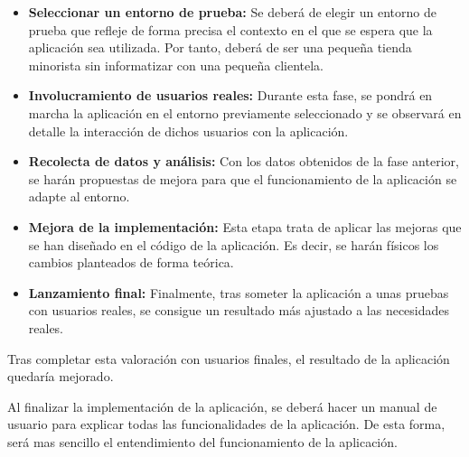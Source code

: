 \begin{itemize}
	\item \textbf{Seleccionar un entorno de prueba: } Se deberá de elegir un entorno de prueba que refleje de forma precisa el contexto en el que se espera que la aplicación sea utilizada. Por tanto, deberá de ser una pequeña tienda minorista sin informatizar con una pequeña clientela. 
	\item \textbf{Involucramiento de usuarios reales: } Durante esta fase, se pondrá en marcha la aplicación en el entorno previamente seleccionado y se observará en detalle la interacción de dichos usuarios con la aplicación. 
	\item \textbf{Recolecta de datos y análisis: } Con los datos obtenidos de la fase anterior, se harán propuestas de mejora para que el funcionamiento de la aplicación se adapte al entorno. 
	\item \textbf{Mejora de la implementación: } Esta etapa trata de aplicar las mejoras que se han diseñado en el código de la aplicación. Es decir, se harán físicos los cambios planteados de forma teórica. 
	\item \textbf{Lanzamiento final: } Finalmente, tras someter la aplicación a unas pruebas con usuarios reales, se consigue un resultado más ajustado a las necesidades reales. 
\end{itemize}

Tras completar esta valoración con  usuarios finales, el resultado de la aplicación quedaría mejorado. 

Al finalizar la implementación de la aplicación, se deberá hacer un manual de usuario para explicar todas las funcionalidades de la aplicación. De esta forma, será mas sencillo el entendimiento del funcionamiento de la aplicación. 